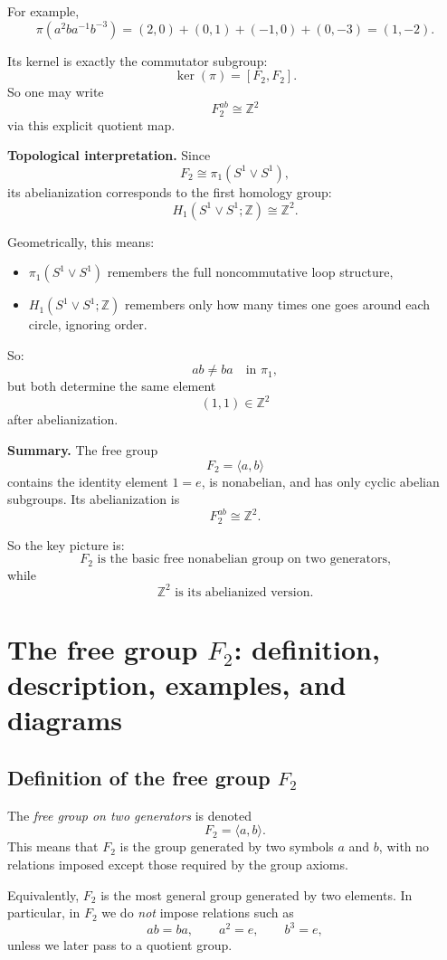 \documentclass[12pt,a4paper]{article}
\theoremstyle{notespace}
\begin{document}
For example,
\[
\pi(a^2ba^{-1}b^{-3})=(2,0)+(0,1)+(-1,0)+(0,-3)=(1,-2).
\]

Its kernel is exactly the commutator subgroup:
\[
\ker(\pi)=[F_2,F_2].
\]
So one may write
\[
F_2^{ab}\cong \mathbb Z^2
\]
via this explicit quotient map.

\bigskip

\textbf{Topological interpretation.}
Since
\[
F_2\cong \pi_1(S^1\vee S^1),
\]
its abelianization corresponds to the first homology group:
\[
H_1(S^1\vee S^1;\mathbb Z)\cong \mathbb Z^2.
\]

Geometrically, this means:
\begin{itemize}
	\item \(\pi_1(S^1\vee S^1)\) remembers the full noncommutative loop structure,
	\item \(H_1(S^1\vee S^1;\mathbb Z)\) remembers only how many times one goes around each circle, ignoring order.
\end{itemize}

So:
\[
ab \neq ba \quad \text{in } \pi_1,
\]
but both determine the same element
\[
(1,1)\in \mathbb Z^2
\]
after abelianization.

\bigskip

\textbf{Summary.}
The free group
\[
F_2=\langle a,b\rangle
\]
contains the identity element \(1=e\), is nonabelian, and has only cyclic abelian subgroups. Its abelianization is
\[
F_2^{ab}\cong \mathbb Z^2.
\]

So the key picture is:
\[
F_2 \text{ is the basic free nonabelian group on two generators,}
\]
while
\[
\mathbb Z^2 \text{ is its abelianized version.}
\]

\section{The free group \texorpdfstring{$F_2$}{F2}: definition, description, examples, and diagrams}

\subsection{Definition of the free group \texorpdfstring{$F_2$}{F2}}

The \emph{free group on two generators} is denoted
\[
F_2=\langle a,b\rangle.
\]
This means that \(F_2\) is the group generated by two symbols \(a\) and \(b\), with no relations imposed except those required by the group axioms.

Equivalently, \(F_2\) is the most general group generated by two elements. In particular, in \(F_2\) we do \emph{not} impose relations such as
\[
ab=ba,\qquad a^2=e,\qquad b^3=e,
\]
unless we later pass to a quotient group.
\end{document}
